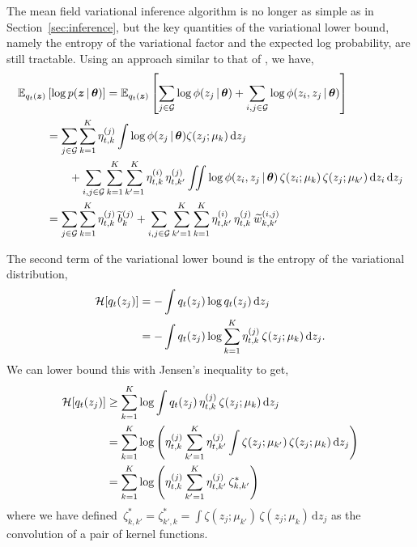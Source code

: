 The mean field variational inference algorithm is no longer as simple as in
Section~\ref{sec:inference}, but the key quantities of the variational
lower bound, namely the entropy of the variational factor and the
expected log probability, are still tractable. Using an approach similar
to that of \citet{gershman2012nonparametric}, we have,
\begin{align}
  \mathbb{E}_{q_t(\boldsymbol{z})} &\left[ \log p(\boldsymbol{z} \,|\, \boldsymbol{\theta}) \right] 
  = \mathbb{E}_{q_t(\boldsymbol{z})} \left[ \sum_{j \in \mathcal{G}}\log \phi(z_j \,|\, \boldsymbol{\theta}) +
    \sum_{i,j \in \mathcal{G}} \log \phi(z_i, z_j \,|\, \boldsymbol{\theta}) \right] \\
  \nonumber
  &= \sum_{j \in \mathcal{G}} \sum_{k=1}^K \eta_{t,k}^{(j)} \int \log \phi(z_j \,|\, \boldsymbol{\theta}) \zeta(z_j; \mu_k) \, \mathrm{d}z_j \\
  &\qquad +
  \sum_{i,j \in \mathcal{G}} \sum_{k=1}^K \sum_{k'=1}^K \eta_{t,k}^{(i)} \, \eta_{t,k'}^{(j)}
  \iint \log \phi(z_i, z_j \,|\, \boldsymbol{\theta}) \, \zeta(z_i; \mu_k) \, \zeta(z_j; \mu_{k'}) \, \mathrm{d}z_i \, \mathrm{d}z_j  \\
  &= \sum_{j \in \mathcal{G}} \sum_{k=1}^K \eta_{t,k}^{(j)} \, \widetilde{b}_k^{(j)} +
  \sum_{i,j \in \mathcal{G}} \sum_{k'=1}^K \sum_{k=1}^K \eta_{t,k'}^{(i)} \, \eta_{t,k}^{(j)} \,
  \widetilde{w}_{k,k'}^{(i,j)}
\end{align}

The second term of the variational lower bound is the entropy of the
variational distribution,
\begin{align}
  \mathcal{H}[q_t(z_j)] &= -\int q_t(z_j) \log q_t(z_j) \, \mathrm{d}z_j \\
  &= -\int q_t(z_j) \log \sum_{k=1}^K \eta_{t,k}^{(j)} \, \zeta(z_j; \mu_k) \, \mathrm{d}z_j.
\end{align}
We can lower bound this with Jensen's inequality to get,
\begin{align}
  \mathcal{H}[q_t(z_j)] &\geq \sum_{k=1}^K \log \int q_t(z_j) \, \eta_{t,k}^{(j)} \, \zeta(z_j; \mu_k) \, \mathrm{d} z_j \\
  &= \sum_{k=1}^K \log \left( \eta_{t,k}^{(j)} \sum_{k'=1}^K \eta_{t,k'}^{(j)} \int  \zeta(z_j; \mu_{k'}) \, \zeta(z_j; \mu_k) \, \mathrm{d} z_j \right) \\
  &= \sum_{k=1}^K \log \left( \eta_{t,k}^{(j)} \sum_{k'=1}^K \eta_{t,k'}^{(j)} \, \zeta_{k,k'}^\ast \right) \\
\end{align}
where we have defined~${\zeta_{k,k'}^\ast = \zeta_{k',k}^\ast = \int  \zeta(z_j; \mu_{k'}) \, \zeta(z_j; \mu_k) \, \mathrm{d} z_j}$ as the convolution of a pair of kernel functions.

